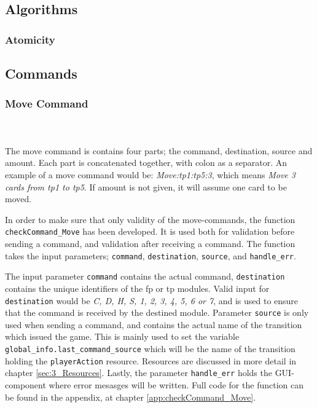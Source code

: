 \documentclass[runningheads,a4paper]{llncs}
\begin{document}
\label{sec:3_gui}
\clearpage
\subsection{Algorithms}
\subsubsection{Atomicity}
\clearpage
\subsection{Commands}
\subsubsection{Move Command}~\\~\\
\label{sec:3_move_command}
The move command is contains four parts; the command, destination, source and amount. Each part is concatenated together, with colon as a separator. An example of a move command would be: \textit{Move:\ac{tp}1:\ac{tp}5:3}, which means \textit{Move 3 cards from \ac{tp}1 to \ac{tp}5}. If amount is not given, it will assume one card to be moved.
\newline

In order to make sure that only validity of the move-commands, the function \verb!checkCommand_Move! has been developed. It is used both for validation before sending a command, and validation after receiving a command. The function takes the input parameters; \verb!command!, \verb!destination!, \verb!source!, and \verb!handle_err!. 
\newline

The input parameter \verb!command! contains the actual command, \verb!destination! contains the unique identifiers of the \ac{fp} or \ac{tp} modules. Valid input for \verb!destination! would be \textit{C, D, H, S, 1, 2, 3, 4, 5, 6 or 7}, and is used to ensure that the command is received by the destined module. Parameter \verb!source! is only used when sending a command, and contains the actual name of the transition which issued the game. This is mainly used to set the variable \verb!global_info.last_command_source! which will be the name of the transition holding the \verb!playerAction! resource. Resources are discussed in more detail in chapter \ref{sec:3_Resources}. Lastly, the parameter \verb!handle_err! holds the GUI-component where error mesasges will be written. Full code for the function can be found in the appendix, at chapter \ref{app:checkCommand_Move}.
\\
\end{document}
